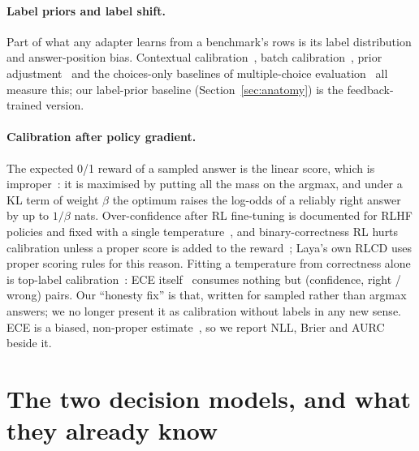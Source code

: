\documentclass[11pt]{article}
\begin{document}
\paragraph{Label priors and label shift.}
Part of what any adapter learns from a benchmark's rows is its label distribution and answer-position bias. Contextual calibration~\citep{zhao2021calibrate}, batch calibration~\citep{zhou2024batch}, prior adjustment~\citep{saerens2002adjusting,lipton2018detecting} and the choices-only baselines of multiple-choice evaluation~\citep{balepur2024choices,zheng2024pride} all measure this; our label-prior baseline (Section~\ref{sec:anatomy}) is the feedback-trained version.

\paragraph{Calibration after policy gradient.}
The expected 0/1 reward of a sampled answer is the linear score, which is improper~\citep{gneiting2007strictly}: it is maximised by putting all the mass on the argmax, and under a KL term of weight $\beta$ the optimum raises the log-odds of a reliably right answer by up to $1/\beta$ nats. Over-confidence after RL fine-tuning is documented for RLHF policies and fixed with a single temperature~\citep{kadavath2022know}, and binary-correctness RL hurts calibration unless a proper score is added to the reward~\citep{damani2026beyond}; Laya's own RLCD uses proper scoring rules for this reason. Fitting a temperature from correctness alone is top-label calibration~\citep{gupta2022toplabel}: ECE itself~\citep{naeini2015ece,guo2017calibration} consumes nothing but (confidence, right / wrong) pairs. Our ``honesty fix'' is that, written for sampled rather than argmax answers; we no longer present it as calibration without labels in any new sense. ECE is a biased, non-proper estimate~\citep{kumar2019verified,roelofs2022mitigating}, so we report NLL, Brier and AURC beside it.

\section{The two decision models, and what they already know}
\label{sec:models}
\end{document}
